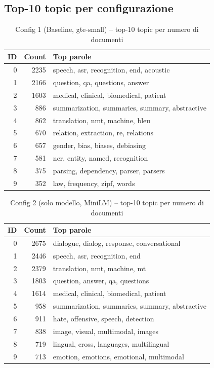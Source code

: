 \documentclass[12pt,a4paper]{article}
\begin{document}
\subsection{Top-10 topic per configurazione}

\begin{table}[H]
  \centering
  \small
  \caption{Config 1 (Baseline, gte-small) -- top-10 topic per numero di documenti}
  \begin{tabular}{rrl}
    \toprule
    \textbf{ID} & \textbf{Count} & \textbf{Top parole} \\
    \midrule
    0 & 2235 & speech, asr, recognition, end, acoustic \\
    1 & 2166 & question, qa, questions, answer \\
    2 & 1603 & medical, clinical, biomedical, patient \\
    3 &  886 & summarization, summaries, summary, abstractive \\
    4 &  862 & translation, nmt, machine, bleu \\
    5 &  670 & relation, extraction, re, relations \\
    6 &  657 & gender, bias, biases, debiasing \\
    7 &  581 & ner, entity, named, recognition \\
    8 &  375 & parsing, dependency, parser, parsers \\
    9 &  352 & law, frequency, zipf, words \\
    \bottomrule
  \end{tabular}
\end{table}

\begin{table}[H]
  \centering
  \small
  \caption{Config 2 (solo modello, MiniLM) -- top-10 topic per numero di documenti}
  \begin{tabular}{rrl}
    \toprule
    \textbf{ID} & \textbf{Count} & \textbf{Top parole} \\
    \midrule
    0 & 2675 & dialogue, dialog, response, conversational \\
    1 & 2446 & speech, asr, recognition, end \\
    2 & 2379 & translation, nmt, machine, mt \\
    3 & 1803 & question, answer, qa, questions \\
    4 & 1614 & medical, clinical, biomedical, patient \\
    5 &  958 & summarization, summaries, summary, abstractive \\
    6 &  911 & hate, offensive, speech, detection \\
    7 &  838 & image, visual, multimodal, images \\
    8 &  719 & lingual, cross, languages, multilingual \\
    9 &  713 & emotion, emotions, emotional, multimodal \\
    \bottomrule
  \end{tabular}
\end{table}
\end{document}
